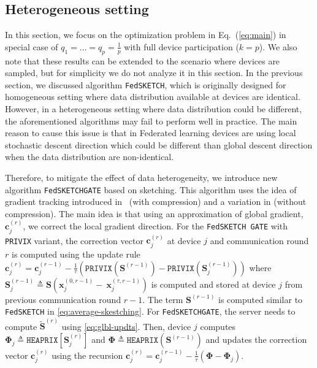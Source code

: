 \subsection{Heterogeneous setting}
In this section, we focus on the optimization problem in Eq.~(\ref{eq:main}) in special case of $q_1=\ldots=q_p=\frac{1}{p}$ with full device participation ($k=p$). We also note that these results can be extended to the scenario where devices are sampled, but for simplicity we do not analyze it in this section. In the previous section, we discussed algorithm \texttt{FedSKETCH}, which is originally designed for homogeneous setting where data distribution available at devices are identical. However, in a heterogeneous setting where data distribution could be different, the aforementioned algorithms may fail to perform well in practice. The main reason to cause this issue is that in Federated learning devices are using local stochastic descent direction which could be different than global descent direction when the data distribution are non-identical. 

Therefore, to mitigate the effect of data heterogeneity, we introduce new algorithm \texttt{FedSKETCHGATE} based on sketching. This algorithm uses the idea of gradient tracking introduced in~\cite{haddadpour2020federated} (with compression) and a variation in \cite{liang2019variance} (without compression). The main idea is that using an approximation of global gradient, $\mathbf{c}_j^{(r)}$, we correct the local gradient direction. For the \texttt{FedSKETCH GATE} with \texttt{PRIVIX} variant, the correction vector $\mathbf{c}_j^{(r)}$ at device $j$ and communication round $r$ is computed using the update rule $\mathbf{c}_j^{(r)}=\mathbf{c}_j^{(r-1)}-\frac{1}{\tau}\left({\texttt{PRIVIX}}\left(\mathbf{S}^{(r-1)}\right)-{\texttt{PRIVIX}}\left(\mathbf{S}^{(r-1)}_{j}\right)\right)$ where $\mathbf{S}^{(r-1)}_{j}\triangleq\mathbf{S}\left(\boldsymbol{x}_j^{(0,r-1)}-~{\boldsymbol{x}}_{j}^{(\tau,r-1)}\right)$ is computed and stored at device $j$ from previous communication round $r-1$. The term $\mathbf{S}^{(r-1)}$ is computed similar to \texttt{FedSKETCH} in \eqref{eq:average-skestching}. 
For \texttt{FedSKETCHGATE}, the server needs to compute $\tilde{\mathbf{S}}^{(r)}$ using \eqref{eq:glbl-updts}. 
Then, device $j$ computes $\mathbf{\Phi}_j\triangleq \texttt{HEAPRIX}[\mathbf{S}_j^{(r)}]$ and $  {\mathbf{\Phi}}\triangleq \texttt{HEAPRIX}(\mathbf{S}^{(r-1)})$ and updates the correction vector $\mathbf{c}_j^{(r)}$ using the recursion $\mathbf{c}_j^{(r)}=\mathbf{c}_j^{(r-1)}-\frac{1}{\tau}\left(\mathbf{\Phi}-\mathbf{\Phi}_j\right)$.

